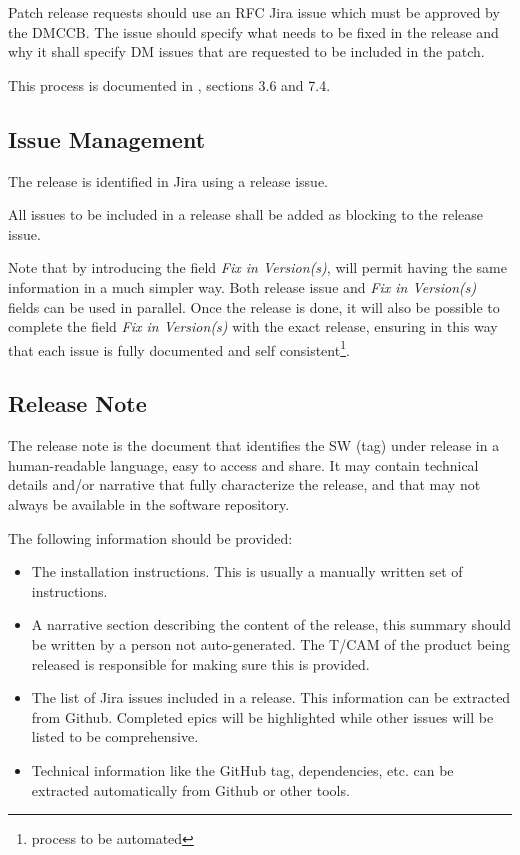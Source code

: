 Patch release requests should use an RFC Jira issue which must be approved by the DMCCB.
The issue should specify what needs to be fixed in the release and why it shall specify DM issues that are requested to be included in the patch.

This process is documented in , sections 3.6 and 7.4.


\subsection{Issue Management} \label{sec:issues}

The release is identified in Jira using a release issue.

All issues to be included in a release shall be added as blocking to the release issue.

Note that by introducing the field \textit{Fix in Version(s)}, will permit having the same information in a much simpler way.
Both release issue and \textit{Fix in Version(s)} fields can be used in parallel.
Once the release is done, it will also be possible to complete the field \textit{Fix in Version(s)} with the exact release,
ensuring in this way that each issue is fully documented and self consistent\footnote{process to be automated}.


\subsection{Release Note} \label{sec:relnote}

The release note is the document that identifies the SW (tag) under release in a human-readable language, easy to access and share. 
It may contain technical details and/or narrative that fully characterize the release, and that may not always be available in the software repository.

The following information should be provided:
\begin{itemize}
\item The installation instructions. This is usually a manually written set of instructions. 
\item A narrative section describing the content of the release, this summary should be written by a person not auto-generated.
The T/CAM of the product being released is responsible for making sure this is provided.
\item The list of Jira issues included in a release. This information can be extracted from Github. 
Completed epics will be highlighted while other issues will be listed to be comprehensive.
\item Technical information like the GitHub tag, dependencies, etc. can be extracted automatically from Github or other tools.
\end{itemize}

